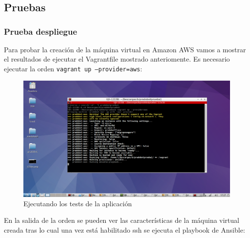 \chapter{}

\section{Pruebas}

\subsection{Prueba despliegue}

Para probar la creación de la máquina virtual en Amazon AWS vamos a mostrar el resultados de ejecutar el Vagrantfile mostrado anteriomente. Es necesario ejecutar la orden \texttt{vagrant up --provider=aws}:
\begin{figure}[H] %
\centering
\includegraphics[scale=0.3]{imagenes/random/2017-09-05-172749_1366x768_scrot.png}  %

\caption{Ejecutando los tests de la aplicación}\label{figura92}

\end{figure}

En la salida de la orden se pueden ver las características de la máquina virtual creada tras lo cual una vez está habilitado ssh se ejecuta el playbook de Ansible:

